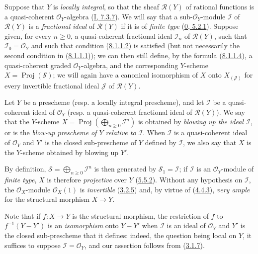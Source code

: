 \begin{env}[8.1.2]
\label{II.8.1.2}
Suppose that $Y$ is \emph{locally integral}, so that the sheaf
$\mathcal{R}(Y)$ of rational functions is a quasi-coherent $\mathcal{O}_Y$-algebra
(\hyperref[I.7.3.7]{I, 7.3.7}). We will say that a
sub-$\mathcal{O}_Y$-module $\mathcal{I}$ of $\mathcal{R}(Y)$ is a
\emph{fractional ideal} of $\mathcal{R}(Y)$ if it is of \emph{finite type}
(\hyperref[0.5.2.1]{0, 5.2.1}). Suppose given, for every $n\geq0$, a
quasi-coherent fractional ideal $\mathcal{I}_n$ of $\mathcal{R}(Y)$, such
that $\mathcal{I}_0=\mathcal{O}_Y$ and such that condition
(\hyperref[II.8.1.1.2]{8.1.1.2}) is satisfied (but not necessarily the
second condition in (\hyperref[II.8.1.1.1]{8.1.1.1})); we can then still
define, by the formula (\hyperref[II.8.1.1.4]{8.1.1.4}), a quasi-coherent
graded $\mathcal{O}_Y$-algebra, and the corresponding $Y$-scheme
$X=\operatorname{Proj}(\mathcal{S})$; we will again have a canonical
isomorphism of $X$ onto $X_{(\mathcal{J})}$ for every invertible fractional
ideal $\mathcal{J}$ of $\mathcal{R}(Y)$.
\end{env}

\begin{definition}[8.1.3]
\label{II.8.1.3}
Let $Y$ be a prescheme (resp. a locally integral prescheme), and let
$\mathcal{I}$ be a quasi-coherent ideal of $\mathcal{O}_Y$ (resp. a quasi-coherent
fractional ideal of $\mathcal{R}(Y)$). We say that the $Y$-scheme
$X=\operatorname{Proj}(\bigoplus_{n\geq0}\mathcal{I}^n)$ is obtained by
\emph{blowing up the ideal $\mathcal{I}$}, or is the \emph{blow-up prescheme
of $Y$ relative to $\mathcal{I}$}. When $\mathcal{I}$ is a
quasi-coherent ideal of $\mathcal{O}_Y$ and $Y'$ is the closed sub-prescheme of $Y$
defined by $\mathcal{I}$, we also say that $X$ is the $Y$-scheme obtained by
blowing up $Y'$.
\end{definition}

By definition, $\mathcal{S}=\bigoplus_{n\geq0}\mathcal{I}^n$ is then
generated by $\mathcal{S}_1=\mathcal{I}$; if $\mathcal{I}$ is an
$\mathcal{O}_Y$-module of \emph{finite type}, $X$ is therefore \emph{projective} over
$Y$ (\hyperref[II.5.5.2]{5.5.2}). Without any hypothesis on $\mathcal{I}$, the
$\mathcal{O}_X$-module $\mathcal{O}_X(1)$ is \emph{invertible}
(\hyperref[II.3.2.5]{3.2.5}) and, by virtue of
(\hyperref[II.4.4.3]{4.4.3}), \emph{very ample} for the structural morphism $X\to Y$.

Note that if $f:X\to Y$ is the structural morphism, the restriction of
$f$ to $f^{-1}(Y-Y')$ is an \emph{isomorphism} onto $Y-Y'$ when
$\mathcal{I}$ is an ideal of $\mathcal{O}_Y$ and $Y'$ is the closed sub-prescheme
that it defines: indeed, the question being local on $Y$, it suffices to
suppose $\mathcal{I}=\mathcal{O}_Y$, and our assertion follows from
(\hyperref[II.3.1.7]{3.1.7}).

